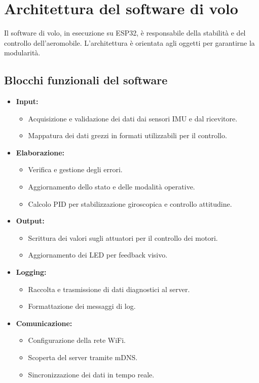 \section{Architettura del software di volo}
Il software di volo, in esecuzione su ESP32, è responsabile della stabilità e del controllo dell'aeromobile. L'architettura è orientata agli oggetti per garantirne la modularità.

\subsection{Blocchi funzionali del software}
\begin{itemize}
\item \textbf{Input:}
\begin{itemize}
\item Acquisizione e validazione dei dati dai sensori IMU e dal ricevitore.
\item Mappatura dei dati grezzi in formati utilizzabili per il controllo.
\end{itemize}
\item \textbf{Elaborazione:}
\begin{itemize}
\item Verifica e gestione degli errori.
\item Aggiornamento dello stato e delle modalità operative.
\item Calcolo PID per stabilizzazione giroscopica e controllo attitudine.
\end{itemize}
\item \textbf{Output:}
\begin{itemize}
\item Scrittura dei valori sugli attuatori per il controllo dei motori.
\item Aggiornamento dei LED per feedback visivo.
\end{itemize}
\item \textbf{Logging:}
\begin{itemize}
\item Raccolta e trasmissione di dati diagnostici al server.
\item Formattazione dei messaggi di log.
\end{itemize}
\item \textbf{Comunicazione:}
\begin{itemize}
\item Configurazione della rete WiFi.
\item Scoperta del server tramite mDNS.
\item Sincronizzazione dei dati in tempo reale.
\end{itemize}
\end{itemize}

